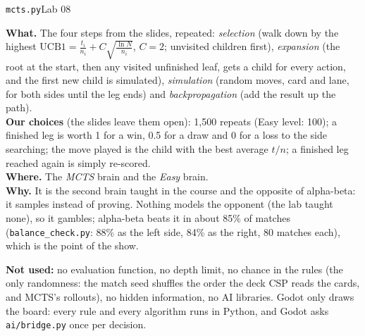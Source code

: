 \documentclass[10pt,a4paper]{article}
\newcommand{\algo}[3]{\vspace{5pt}{\color{navy}\large\bfseries #1}\hfill{\small\color{soft}\texttt{#2}\quad #3}\par\vspace{1pt}}
\newcommand{\row}[1]{\textbf{#1}\enspace}
\begin{document}
\algo{8. Monte Carlo Tree Search (UCB1)}{mcts.py}{Lab 08}
\row{What.} The four steps from the slides, repeated: \emph{selection} (walk down by the highest $\mathrm{UCB1}=\tfrac{t_i}{n_i}+C\sqrt{\tfrac{\ln N}{n_i}}$, $C=2$; unvisited children first), \emph{expansion} (the root at the start, then any visited unfinished leaf, gets a child for every action, and the first new child is simulated), \emph{simulation} (random moves, card and lane, for both sides until the leg ends) and \emph{backpropagation} (add the result up the path).\\
\row{Our choices} (the slides leave them open): 1,500 repeats (Easy level: 100); a finished leg is worth 1 for a win, 0.5 for a draw and 0 for a loss to the side searching; the move played is the child with the best average $t/n$; a finished leg reached again is simply re-scored.\\
\row{Where.} The \emph{MCTS} brain and the \emph{Easy} brain.\\
\row{Why.} It is the second brain taught in the course and the opposite of alpha-beta: it samples instead of proving. Nothing models the opponent (the lab taught none), so it gambles; alpha-beta beats it in about 85\% of matches (\texttt{balance\_check.py}: 88\% as the left side, 84\% as the right, 80 matches each), which is the point of the show.

\vspace{5pt}
{\color{soft}\small\textbf{Not used:} no evaluation function, no depth limit, no chance in the rules (the only randomness: the match seed shuffles the order the deck CSP reads the cards, and MCTS's rollouts), no hidden information, no AI libraries. Godot only draws the board: every rule and every algorithm runs in Python, and Godot asks \texttt{ai/bridge.py} once per decision.}
\end{document}
